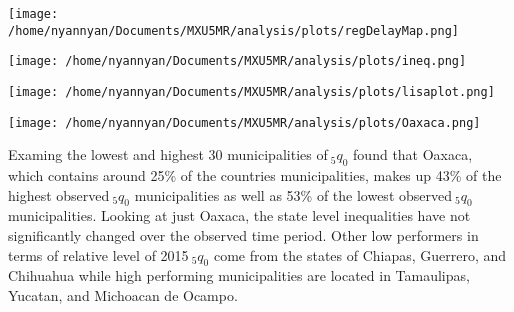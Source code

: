 \documentclass[a0,portrait]{a0poster}
\begin{document}
\begin{multicols}{2}
%
\begin{center}\vspace{1cm}
\texttt{[image: /home/nyannyan/Documents/MXU5MR/analysis/plots/regDelayMap.png]}
\end{center}\vspace{1cm}
%

%
\begin{center}\vspace{1cm}
\texttt{[image: /home/nyannyan/Documents/MXU5MR/analysis/plots/ineq.png]}
\end{center}\vspace{1cm}
%

%
\begin{center}\vspace{1cm}
\texttt{[image: /home/nyannyan/Documents/MXU5MR/analysis/plots/lisaplot.png]}
\end{center}\vspace{1cm}
%

%
\begin{center}\vspace{1cm}
\texttt{[image: /home/nyannyan/Documents/MXU5MR/analysis/plots/Oaxaca.png]}
\end{center}\vspace{1cm}
%

Examing the lowest and highest 30 municipalities of$~_{5}q_{0}$ found that Oaxaca, which contains around 25\% of the countries municipalities, makes up 43\% of the highest observed$~_{5}q_{0}$ municipalities as well as 53\% of the lowest observed$~_{5}q_{0}$ municipalities. Looking at just Oaxaca, the state level inequalities have not significantly changed over the observed time period. Other low performers in terms of relative level of 2015$~_{5}q_{0}$ come from the states of Chiapas, Guerrero, and Chihuahua while high performing municipalities are located in Tamaulipas, Yucatan, and Michoacan de Ocampo.

\color{black} %


\end{multicols}
\end{document}
